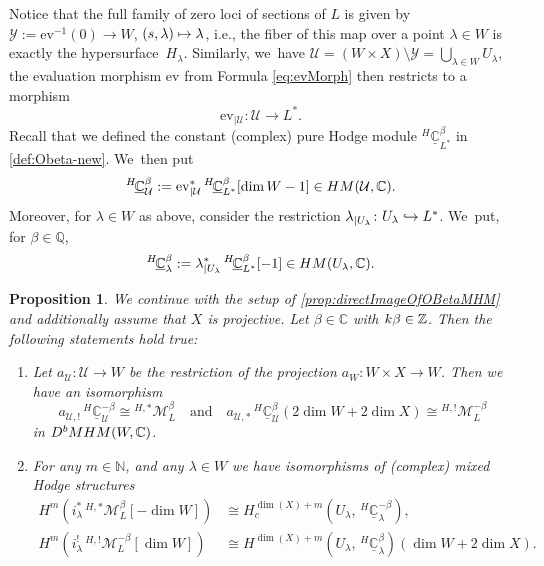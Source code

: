 \documentclass[11pt]{article}
\newcommand{\ie}{i.e.,\xspace}
\let\mathds\mathbb
\newcommand\mto{\mathchoice{\longmapsto}{\mapsto}{\mapsto}{\mapsto}}
\newcommand\hto{\mathrel{\lhook\joinrel\to}}
\newcommand{\quand}{\quad\text{and}\quad}
\newcommand{\ev}{\mathrm{ev}}
\newtheorem{prop}[thm]{Proposition}
\newcommand{\dC}{{\mathds C}}\let\C\dC
\newcommand{\dQ}{{\mathds Q}}\let\Q\dQ
\newcommand{\dN}{{\mathds N}}\let\N\dN
\newcommand{\cM}{\mathcal{M}}
\newcommand{\cU}{\mathcal{U}}\let\mcu\cU
\newcommand{\cY}{\mathcal{Y}}\let\mcy\cY
\newcommand{\MHM}{\textup{MHM}}
\newcommand{\HM}{\textup{HM}}
\newcommand{\Mh}{{^{H,*}}\cM_L^\beta}
\newcommand{\MhD}{{^{H,!}}\cM_L^{-\beta}}
\begin{document}
Notice that the full family of zero loci of sections of $L$ is given by $\cY:=\ev^{-1}(0) \to W$, $(s,\lambda)\mto \lambda$, \ie the fiber of this map over a point $\lambda\in W$ is exactly the hypersurface~$H_\lambda$.
Similarly, we~have
$\cU =(W\times X)\setminus \cY = \bigcup_{\lambda\in W} U_\lambda$, the evaluation morphism $\ev$ from Formula
\eqref{eq:evMorph} then restricts to a morphism
\[
\ev_{|\cU} \colon \cU \to L^*.
\]
Recall that we defined the constant (complex) pure Hodge module $^{H\!}\underline{\dC}^\beta_{L^*}$ in \cref{def:Obeta-new}. We~then put
\[
^{H\!}\underline{\dC}^\beta_{\cU} := {\ev_{|\cU}^*}
\,{^{H\!}}\underline{\dC}^\beta_{L^*}[\dim W -1]
\in\HM(\cU,\dC).
\]
Moreover, for $\lambda\in W$ as above, consider
the restriction $\lambda_{|U_\lambda}\colon U_\lambda
\hto L^*$. We~put, for $\beta\in \dQ$,
\[
{}^{H\!}\underline{\dC}^\beta_\lambda:=\lambda^*_{|U_\lambda}\, ^{H\!}\underline{\dC}^\beta_{L^*}[-1]\in \HM(U_\lambda,\dC).
\]

\begin{prop}\label{prop:TautIsDirectImage} We continue with the setup of \cref{prop:directImageOfOBetaMHM} and additionally assume that $X$ is projective. Let $\beta \in \C$ with $k\beta \in \Z$. Then the following statements hold true:
\begin{enumerate}
\item\label{prop:TautIsDirectImage1}
Let $a_{\cU}\colon \cU\to W$ be the restriction of the projection $a_W\colon W\times X\to W$. Then we have an isomorphism
\[
a_{\cU,!} \, ^{H\!}\underline{\dC}^{-\beta}_{\cU}
\cong \Mh
\quand
a_{\cU,*} \, ^{H\!}\underline{\dC}^{\beta}_{\cU}(2 \dim W + 2\dim X)
\cong \MhD
\]
in $ D^b\MHM(W,\dC)$.
\item\label{prop:TautIsDirectImage2}
For any $m \in \dN$, and any $\lambda\in W$ we have isomorphisms of (complex) mixed Hodge structures
\begin{align*}
H^m(i_\lambda^* \, \Mh[-\dim W]) &\cong H_c^{\dim(X) + m}(U_\lambda,\,^{H\!}\underline{\dC}^{-\beta}_\lambda), \\
H^m(i_\lambda^! \, \MhD[\dim W]) &\cong H^{\dim(X)+m}(U_\lambda,\,^{H\!}\underline{\dC}^{\beta}_\lambda) (\dim W + 2 \dim X). 
\end{align*}
\end{enumerate}
\end{prop}
\end{document}
